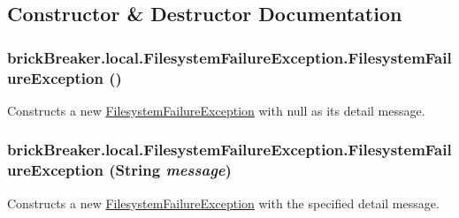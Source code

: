 \subsection{Constructor \& Destructor Documentation}
\hypertarget{classbrick_breaker_1_1local_1_1_filesystem_failure_exception_ab904cd4c69c1a418f1651cd72822e967}{
\subsubsection[{FilesystemFailureException}]{\setlength{\rightskip}{0pt plus 5cm}brickBreaker.local.FilesystemFailureException.FilesystemFailureException ()}}
\label{classbrick_breaker_1_1local_1_1_filesystem_failure_exception_ab904cd4c69c1a418f1651cd72822e967}
Constructs a new {\ttfamily \hyperlink{classbrick_breaker_1_1local_1_1_filesystem_failure_exception}{FilesystemFailureException}} with {\ttfamily null} as its detail message. \hypertarget{classbrick_breaker_1_1local_1_1_filesystem_failure_exception_a6dbc8c054777a998dbd706490b6d5fd5}{
\subsubsection[{FilesystemFailureException}]{\setlength{\rightskip}{0pt plus 5cm}brickBreaker.local.FilesystemFailureException.FilesystemFailureException (String {\em message})}}
\label{classbrick_breaker_1_1local_1_1_filesystem_failure_exception_a6dbc8c054777a998dbd706490b6d5fd5}
Constructs a new {\ttfamily \hyperlink{classbrick_breaker_1_1local_1_1_filesystem_failure_exception}{FilesystemFailureException}} with the specified detail message.


